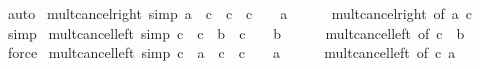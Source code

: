 \begin{isabellebody}
\ auto%
\endisatagproof
{\isafoldproof}%
%
\isadelimproof
\isanewline
%
\endisadelimproof
\isanewline
{}\isamarkupfalse%
\ mult{\isacharunderscore}{\kern0pt}cancel{\isacharunderscore}{\kern0pt}right{}\ {\isacharbrackleft}{\kern0pt}simp{\isacharbrackright}{\kern0pt}{\isacharcolon}{\kern0pt}\ {\isachardoublequoteopen}a\ {\isacharasterisk}{\kern0pt}\ c\ {\isacharequal}{\kern0pt}\ c\ {\isasymlongleftrightarrow}\ c\ {\isacharequal}{\kern0pt}\ {}\ {\isasymor}\ a\ {\isacharequal}{\kern0pt}\ {}{\isachardoublequoteclose}\isanewline
%
\isadelimproof
\ \ %
\endisadelimproof
%
\isatagproof
{}\isamarkupfalse%
\ mult{\isacharunderscore}{\kern0pt}cancel{\isacharunderscore}{\kern0pt}right\ {\isacharbrackleft}{\kern0pt}of\ a\ c\ {}{\isacharbrackright}{\kern0pt}\ \isamarkupfalse%
\ simp%
\endisatagproof
{\isafoldproof}%
%
\isadelimproof
\isanewline
%
\endisadelimproof
\isanewline
{}\isamarkupfalse%
\ mult{\isacharunderscore}{\kern0pt}cancel{\isacharunderscore}{\kern0pt}left{}\ {\isacharbrackleft}{\kern0pt}simp{\isacharbrackright}{\kern0pt}{\isacharcolon}{\kern0pt}\ {\isachardoublequoteopen}c\ {\isacharequal}{\kern0pt}\ c\ {\isacharasterisk}{\kern0pt}\ b\ {\isasymlongleftrightarrow}\ c\ {\isacharequal}{\kern0pt}\ {}\ {\isasymor}\ b\ {\isacharequal}{\kern0pt}\ {}{\isachardoublequoteclose}\isanewline
%
\isadelimproof
\ \ %
\endisadelimproof
%
\isatagproof
{}\isamarkupfalse%
\ mult{\isacharunderscore}{\kern0pt}cancel{\isacharunderscore}{\kern0pt}left\ {\isacharbrackleft}{\kern0pt}of\ c\ {}\ b{\isacharbrackright}{\kern0pt}\ \isamarkupfalse%
\ force%
\endisatagproof
{\isafoldproof}%
%
\isadelimproof
\isanewline
%
\endisadelimproof
\isanewline
{}\isamarkupfalse%
\ mult{\isacharunderscore}{\kern0pt}cancel{\isacharunderscore}{\kern0pt}left{}\ {\isacharbrackleft}{\kern0pt}simp{\isacharbrackright}{\kern0pt}{\isacharcolon}{\kern0pt}\ {\isachardoublequoteopen}c\ {\isacharasterisk}{\kern0pt}\ a\ {\isacharequal}{\kern0pt}\ c\ {\isasymlongleftrightarrow}\ c\ {\isacharequal}{\kern0pt}\ {}\ {\isasymor}\ a\ {\isacharequal}{\kern0pt}\ {}{\isachardoublequoteclose}\isanewline
%
\isadelimproof
\ \ %
\endisadelimproof
%
\isatagproof
{}\isamarkupfalse%
\ mult{\isacharunderscore}{\kern0pt}cancel{\isacharunderscore}{\kern0pt}left\ {\isacharbrackleft}{\kern0pt}of\ c\ a\ {}{\isacharbrackright}{\kern0pt}\ \isamarkupfalse%

\end{isabellebody}
